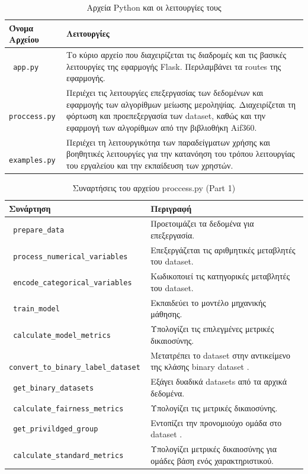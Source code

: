 \documentclass[12pt,twoside]{article}
\newcommand{\en}{\selectlanguage{english}}
\newcommand{\gr}{\selectlanguage{greek}}
\begin{document}
\newpage
\begin{table}[h!]
\centering
\caption{\gr Αρχεία \en Python \gr και οι λειτουργίες τους}
\begin{tabular}{|l|p{10cm}|}
\hline
\textbf{\gr Όνομα Αρχείου} & \textbf{\gr Λειτουργίες} \\ \hline
\texttt{ \en app.py} & \gr Το κύριο αρχείο που διαχειρίζεται τις διαδρομές και τις βασικές λειτουργίες της εφαρμογής \en Flask\gr. Περιλαμβάνει τα \en routes \gr της εφαρμογής. \\ \hline
\texttt{ \en proccess.py} & \gr Περιέχει τις λειτουργίες επεξεργασίας των δεδομένων και εφαρμογής των αλγορίθμων μείωσης μεροληψίας. Διαχειρίζεται τη φόρτωση και προεπεξεργασία των \en dataset\gr, καθώς και την εφαρμογή των αλγορίθμων από την βιβλιοθήκη \en Aif360\gr. \\ \hline
\texttt{ \en examples.py} & \gr Περιέχει τη λειτουργικότηα των παραδείγματων χρήσης και βοηθητικές λειτουργίες για την κατανόηση του τρόπου λειτουργίας του εργαλείου και την εκπαίδευση των χρηστών. \\ \hline
\end{tabular}
\end{table}

\newpage
\begin{table}[H]
\centering
\caption{\gr Συναρτήσεις του αρχείου \en proccess.py (Part 1)}
\begin{tabular}{|p{7cm}|p{7cm}|}
\hline
\textbf{\gr Συνάρτηση} & \textbf{\gr Περιγραφή} \\ \hline
\texttt{ \en prepare\_data} & \gr Προετοιμάζει τα δεδομένα για επεξεργασία. \\ \hline
\texttt{ \en process\_numerical\_variables} & \gr Επεξεργάζεται τις αριθμητικές μεταβλητές του \en dataset\gr. \\ \hline
\texttt{ \en encode\_categorical\_variables} & \gr Κωδικοποιεί τις κατηγορικές μεταβλητές του \en dataset\gr. \\ \hline
\texttt{ \en train\_model} & \gr Εκπαιδεύει το μοντέλο μηχανικής μάθησης. \\ \hline
\texttt{ \en calculate\_model\_metrics} & \gr Υπολογίζει τις επιλεγμένες μετρικές δικαιοσύνης. \\ \hline
\texttt{ \en convert\_to\_binary\_label\_dataset} & \gr Μετατρέπει το \en dataset \gr στην αντικείμενο της κλάσης \en binary dataset . \\ \hline
\texttt{ \en get\_binary\_datasets} & \gr Εξάγει δυαδικά \en datasets \gr από τα αρχικά δεδομένα. \\ \hline
\texttt{ \en calculate\_fairness\_metrics} & \gr Υπολογίζει τις μετρικές δικαιοσύνης. \\ \hline
\texttt{ \en get\_privildged\_group} & \gr Εντοπίζει την προνομιούχο ομάδα στο \en dataset \gr. \\ \hline
\texttt{ \en calculate\_standard\_metrics} & \gr Υπολογίζει μετρικές δικαιοσύνης για ομάδες βάση ενός χαρακτηριστικού. \\ \hline
\end{tabular}
\end{table}
\end{document}
